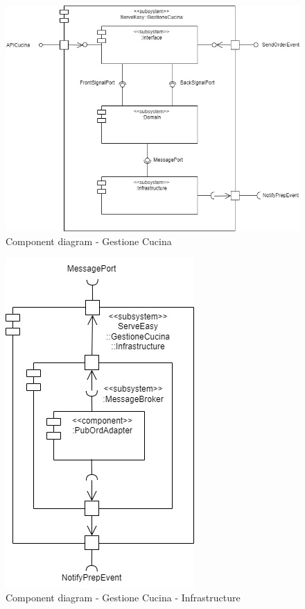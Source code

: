\begin{figure}[htbp]
	\centering
	\includegraphics[scale=0.5]{iterazione1/images/component_comanda_cucina-GestioneCucina.jpg}
	\caption{Component diagram - Gestione Cucina \label{fig:component_diagram_gestione_cucina}}
\end{figure}


\begin{figure}[htbp]
	\centering
	\includegraphics[scale=0.5]{iterazione1/images/component_comanda_cucina-GestioneCucina__Infrastructure.jpg}
	\caption{Component diagram - Gestione Cucina - Infrastructure \label{fig:component_diagram_gestione_cucina_infrastructure}}
\end{figure}

